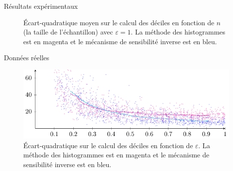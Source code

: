 \documentclass[10pt,serif]{beamer}
\begin{document}
\begin{frame}{Résultats expérimentaux}
{\begin{figure}
        \caption{Écart-quadratique moyen sur le calcul des déciles en fonction de \(n\) (la taille de l'échantillon) avec \(\varepsilon = 1\). La méthode des histogrammes est en {\color{magenta} magenta} et le mécanisme de sensibilité inverse est en {\color{blue} bleu}.}
      \end{figure}}
  \end{frame}

  \begin{frame}{Données réelles}
    \begin{figure}[H]
      \centering  
      \includegraphics[clip]{"./proofs/figures/cdoRBCZD8XdSJKfP.pdf"}
      \caption{Écart-quadratique sur le calcul des déciles en fonction de \(\varepsilon\). La méthode des histogrammes est en {\color{magenta} magenta} et le mécanisme de sensibilité inverse est en {\color{blue} bleu}.}
      \label{fig2}
    \end{figure}
  \end{frame}
\end{document}
